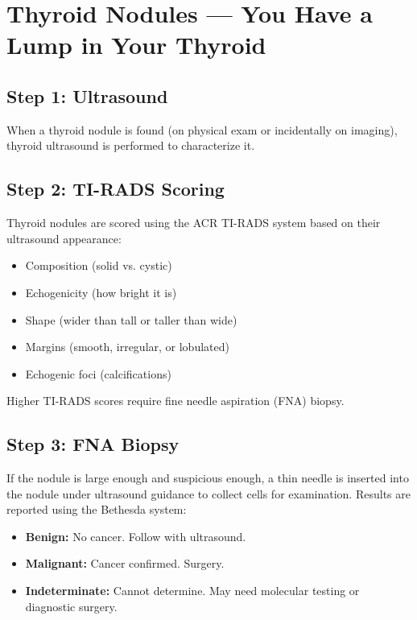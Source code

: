 \clearpage
\section{Thyroid Nodules --- You Have a Lump in Your Thyroid}

\subsection{Step 1: Ultrasound}

When a thyroid nodule is found (on physical exam or incidentally on imaging), thyroid ultrasound is performed to characterize it.

\subsection{Step 2: TI-RADS Scoring}

Thyroid nodules are scored using the ACR TI-RADS system based on their ultrasound appearance:
\begin{itemize}
    \item Composition (solid vs. cystic)
    \item Echogenicity (how bright it is)
    \item Shape (wider than tall or taller than wide)
    \item Margins (smooth, irregular, or lobulated)
    \item Echogenic foci (calcifications)
\end{itemize}

Higher TI-RADS scores require fine needle aspiration (FNA) biopsy.

\subsection{Step 3: FNA Biopsy}

If the nodule is large enough and suspicious enough, a thin needle is inserted into the nodule under ultrasound guidance to collect cells for examination. Results are reported using the Bethesda system:
\begin{itemize}
    \item \textbf{Benign:} No cancer. Follow with ultrasound.
    \item \textbf{Malignant:} Cancer confirmed. Surgery.
    \item \textbf{Indeterminate:} Cannot determine. May need molecular testing or diagnostic surgery.
\end{itemize}

